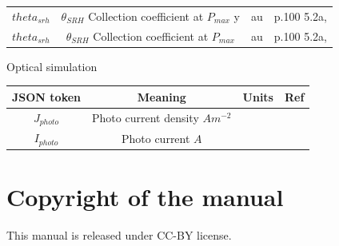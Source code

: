 \begin{center}
\begin{tabular}{ |c|c|c| c|}
$theta_{srh}$ & $\theta_{SRH}$ Collection coefficient at $P_{max}$ y & au &p.100 5.2a\cite{Summon-FETCH-bonn_catalog_45326403},\cite{PhysRevApplied.6.024001}\\
$theta_{srh}$ & $\theta_{SRH}$ Collection coefficient at $P_{max}$ & au &p.100 5.2a\cite{Summon-FETCH-bonn_catalog_45326403},\cite{PhysRevApplied.6.024001}\\

\hline
\end{tabular}
\end{center}

Optical simulation

\begin{center}
\begin{tabular}{ |c|c|c| c|} 
\hline
JSON token & Meaning & Units & Ref \\
\hline
$J_{photo}$ & Photo current density $Am^{-2}$& &\\
$I_{photo}$ & Photo current $A$& &\\


\hline
\end{tabular}
\end{center}

\section{Copyright of the manual}
This manual is released under CC-BY license.

